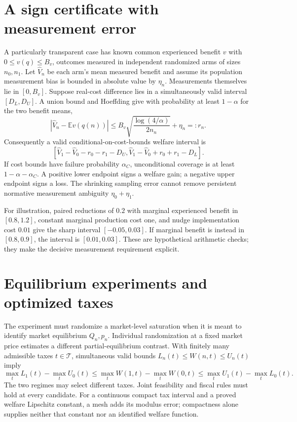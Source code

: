 \documentclass[11pt]{article}
\theoremstyle{definition}
\newcommand{\E}{\mathbb E}
\begin{document}
\section*{A sign certificate with measurement error}
A particularly transparent case has known common experienced benefit $v$ with
$0\le v(q)\le B_v$, outcomes measured in independent randomized arms of sizes
$n_0,n_1$. Let $\widehat V_n$ be each arm's mean measured benefit and assume
its population measurement bias is bounded in absolute value by $\eta_n$.
Measurements themselves lie in $[0,B_v]$. Suppose real-cost difference lies in
a simultaneously valid interval $[D_L,D_U]$. A union bound and Hoeffding give
with probability at least $1-\alpha$ for the two benefit means,
\[
 |\widehat V_n-\E v(q(n))|\le
 B_v\sqrt{\frac{\log(4/\alpha)}{2n_n}}+\eta_n=:r_n.
\]
Consequently a valid conditional-on-cost-bounds welfare interval is
\[
 [\widehat V_1-\widehat V_0-r_0-r_1-D_U,
   \widehat V_1-\widehat V_0+r_0+r_1-D_L].                 \tag{1}
\]
If cost bounds have failure probability $\alpha_C$, unconditional coverage is
at least $1-\alpha-\alpha_C$. A positive lower endpoint signs a welfare gain;
a negative upper endpoint signs a loss. The shrinking sampling error cannot
remove persistent normative measurement ambiguity $\eta_0+\eta_1$.

For illustration, paired reductions of $0.2$ with marginal experienced benefit
in $[0.8,1.2]$, constant marginal production cost one, and nudge implementation
cost $0.01$ give the sharp interval $[-0.05,0.03]$. If marginal benefit is instead
in $[0.8,0.9]$, the interval is $[0.01,0.03]$. These are hypothetical arithmetic
checks; they make the decisive measurement requirement explicit.

\section*{Equilibrium experiments and optimized taxes}
The experiment must randomize a market-level saturation when it is meant to
identify market equilibrium $Q_n,p_n$. Individual randomization at a fixed
market price estimates a different partial-equilibrium contrast. With finitely
many admissible taxes $t\in\mathcal T$, simultaneous valid bounds
$L_n(t)\le W(n,t)\le U_n(t)$ imply
\[
 \max_tL_1(t)-\max_tU_0(t)
 \le\max_tW(1,t)-\max_tW(0,t)
 \le\max_tU_1(t)-\max_tL_0(t).
\]
The two regimes may select different taxes. Joint feasibility and fiscal rules
must hold at every candidate. For a continuous compact tax interval and a
proved welfare Lipschitz constant, a mesh adds its modulus error; compactness
alone supplies neither that constant nor an identified welfare function.
\end{document}
